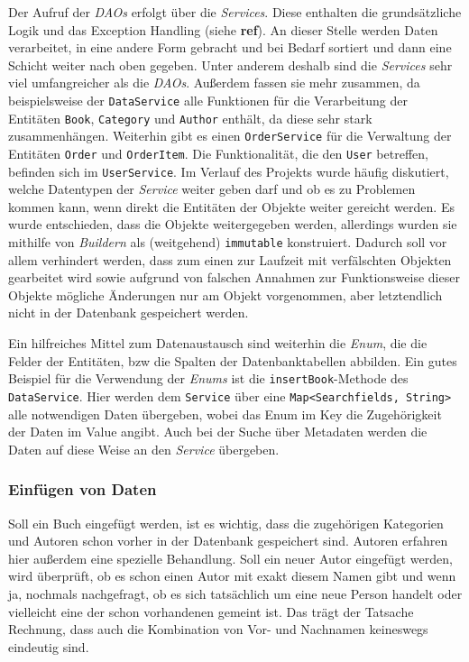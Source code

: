 		Der Aufruf der \textit{DAOs} erfolgt über die \textit{Services}. Diese enthalten die grundsätzliche Logik und das Exception Handling (siehe \textbf{ref}). An dieser Stelle werden Daten verarbeitet, in eine andere Form gebracht und bei Bedarf sortiert und dann eine Schicht weiter nach oben gegeben. Unter anderem deshalb sind die \textit{Services} sehr viel umfangreicher als die \textit{DAOs}. Außerdem fassen sie mehr zusammen, da beispielsweise der \texttt{DataService} alle Funktionen für die Verarbeitung der Entitäten \texttt{Book}, \texttt{Category} und \texttt{Author} enthält, da diese sehr stark zusammenhängen. Weiterhin gibt es einen \texttt{OrderService} für die Verwaltung der Entitäten \texttt{Order} und \texttt{OrderItem}. Die Funktionalität, die den \texttt{User} betreffen, befinden sich im \texttt{UserService}. Im Verlauf des Projekts wurde häufig diskutiert, welche Datentypen der \textit{Service} weiter geben darf und ob es zu Problemen kommen kann, wenn direkt die Entitäten der Objekte weiter gereicht werden. Es wurde entschieden, dass die Objekte weitergegeben werden, allerdings wurden sie mithilfe von \textit{Buildern} als (weitgehend) \texttt{immutable} konstruiert. Dadurch soll vor allem verhindert werden, dass zum einen zur Laufzeit mit verfälschten Objekten gearbeitet wird sowie aufgrund von falschen Annahmen zur Funktionsweise dieser Objekte mögliche Änderungen nur am Objekt vorgenommen, aber letztendlich nicht in der Datenbank gespeichert werden.
		 
		Ein hilfreiches Mittel zum Datenaustausch sind weiterhin die \textit{Enum}, die die Felder der Entitäten, bzw die Spalten der Datenbanktabellen abbilden. Ein gutes Beispiel für die Verwendung der \textit{Enums} ist die \texttt{insertBook}-Methode des \texttt{DataService}. Hier werden dem \texttt{Service} über eine \texttt{Map\textless Searchfields, String\textgreater } alle notwendigen Daten übergeben, wobei das Enum im Key die Zugehörigkeit der Daten im Value angibt. Auch bei der Suche über Metadaten werden die Daten auf diese Weise an den \textit{Service} übergeben.
		
		\subsubsection{Einfügen von Daten}\label{umsetzung:DB:Einfuegen}
		Soll ein Buch eingefügt werden, ist es wichtig, dass die zugehörigen Kategorien und Autoren schon vorher in der Datenbank gespeichert sind. Autoren erfahren hier außerdem eine spezielle Behandlung. Soll ein neuer Autor eingefügt werden, wird überprüft, ob es schon einen Autor mit exakt diesem Namen gibt und wenn ja, nochmals nachgefragt, ob es sich tatsächlich um eine neue Person handelt oder vielleicht eine der schon vorhandenen gemeint ist. Das trägt der Tatsache Rechnung, dass auch die Kombination von Vor- und Nachnamen keineswegs eindeutig sind. 
		
